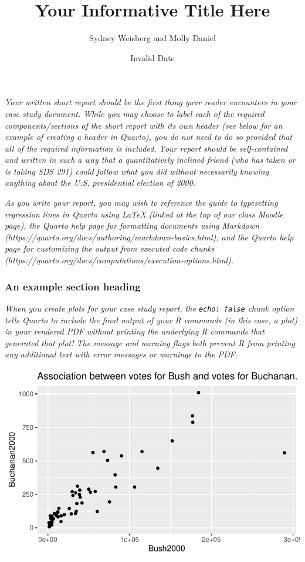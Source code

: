 \documentclass[
  letterpaper,
  DIV=11,
  numbers=noendperiod]{scrartcl}
\title{Your Informative Title Here}
\author{Sydney Weisberg and Molly Daniel}
\date{Invalid Date}
\begin{document}
\maketitle
\ifdefined\Shaded\renewenvironment{Shaded}{\begin{tcolorbox}[breakable, enhanced, borderline west={3pt}{0pt}{shadecolor}, interior hidden, boxrule=0pt, frame hidden, sharp corners]}{\end{tcolorbox}}\fi

\emph{Your written short report should be the first thing your reader
encounters in your case study document. While you may choose to label
each of the required components/sections of the short report with its
own header (see below for an example of creating a header in Quarto),
you do not need to do so provided that all of the required information
is included. Your report should be self-contained and written in such a
way that a quantitatively inclined friend (who has taken or is taking
SDS 291) could follow what you did without necessarily knowing anything
about the U.S. presidential election of 2000.}

\emph{As you write your report, you may wish to reference the guide to
typesetting regression lines in Quarto using LaTeX (linked at the top of
our class Moodle page), the Quarto help page for formatting documents
using Markdown (https://quarto.org/docs/authoring/markdown-basics.html),
and the Quarto help page for customizing the output from executed code
chunks (https://quarto.org/docs/computations/execution-options.html).}

\hypertarget{an-example-section-heading}{%
\subsubsection{An example section
heading}\label{an-example-section-heading}}

\emph{When you create plots for your case study report, the
\texttt{echo:\ false} chunk option tells Quarto to include the final
output of your R commands (in this case, a plot) in your rendered PDF
\emph{without} printing the underlying R commands that generated that
plot! The message and warning flags both prevent R from printing any
additional text with error messages or warnings to the PDF.}

\includegraphics{case_study_1_files/figure-pdf/unnamed-chunk-6-1.pdf}
\end{document}
